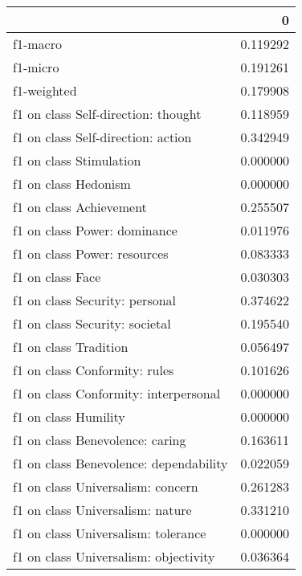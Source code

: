 \begin{tabular}{lr}
\toprule
{} &         0 \\
\midrule
f1-macro                               &  0.119292 \\
f1-micro                               &  0.191261 \\
f1-weighted                            &  0.179908 \\
f1 on class Self-direction: thought    &  0.118959 \\
f1 on class Self-direction: action     &  0.342949 \\
f1 on class Stimulation                &  0.000000 \\
f1 on class Hedonism                   &  0.000000 \\
f1 on class Achievement                &  0.255507 \\
f1 on class Power: dominance           &  0.011976 \\
f1 on class Power: resources           &  0.083333 \\
f1 on class Face                       &  0.030303 \\
f1 on class Security: personal         &  0.374622 \\
f1 on class Security: societal         &  0.195540 \\
f1 on class Tradition                  &  0.056497 \\
f1 on class Conformity: rules          &  0.101626 \\
f1 on class Conformity: interpersonal  &  0.000000 \\
f1 on class Humility                   &  0.000000 \\
f1 on class Benevolence: caring        &  0.163611 \\
f1 on class Benevolence: dependability &  0.022059 \\
f1 on class Universalism: concern      &  0.261283 \\
f1 on class Universalism: nature       &  0.331210 \\
f1 on class Universalism: tolerance    &  0.000000 \\
f1 on class Universalism: objectivity  &  0.036364 \\
\bottomrule
\end{tabular}
